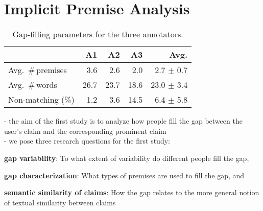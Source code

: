 \section{Implicit Premise Analysis}

\begin{table}[t]
{\small
\begin{center}
\begin{tabular}{lrrrr}
\toprule
& A1 & A2 & A3 & Avg.\\
\midrule
Avg.~\#\,premises  & 3.6  & 2.6   & 2.0   &  \phantom{0}2.7 $\pm$ 0.7  \\
Avg.~\#\,words     & 26.7 & 23.7  & 18.6  &  23.0 $\pm$ 3.4      \\
Non-matching (\%)     & 1.2  & 3.6   & 14.5  &  \phantom{0}6.4 $\pm$ 5.8  \\
\bottomrule
\end{tabular}
\caption{Gap-filling parameters for the three annotators.}
\label{tab:var-annotators}
\end{center}}
\end{table}

- the aim of the first study is to analyze how people fill 
the gap between the user's claim and the corresponding prominent claim \\
- we pose three research questions for the first study: 
\begin{enumerate*}[label=\arabic*)]
\item \textbf{gap variability}: To what extent of variability do different people fill the gap,
\item \textbf{gap characterization}: What types of premises are used to fill the gap, and
\item \textbf{semantic similarity of claims}: How the gap relates to the more general notion of 
textual similarity between claims 
\end{enumerate*} \\

